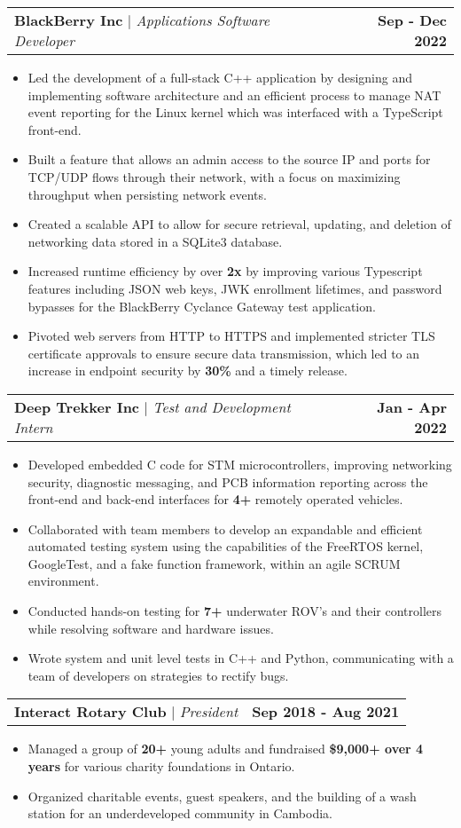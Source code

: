 \documentclass[letterpaper,11pt]{article}
\makeatletter
\newcommand{\subItem}[1]{
  \item\small{{#1 \vspace{-2pt}}}}
\newcommand{\subHeading}[2]{
  \vspace{-5pt}\item
  \begin{tabular*}{1.001\textwidth}{l@{\extracolsep{\fill}}r}
    \small#1 & \textbf{\small #2} 
    \setlength{\parskip}{6pt}
  \end{tabular*}\vspace{-7pt}}
\newcommand{\subItemListStart}{\begin{itemize}}
\newcommand{\subItemListEnd}{\end{itemize}\vspace{-5pt}}
\makeatother
\begin{document}
    \subHeading
      {\textbf{BlackBerry Inc} $|$ \emph{Applications Software Developer}}
      {Sep - Dec 2022}
    \subItemListStart
      \subItem{Led the development of a full-stack C++ application by designing and implementing software architecture and an efficient process to manage NAT event reporting for the Linux kernel which was interfaced with a TypeScript front-end.}
      \subItem{Built a feature that allows an admin access to the source IP and ports for TCP/UDP flows through their network, with a focus on maximizing throughput when persisting network events.}
      \subItem{Created a scalable API to allow for secure retrieval, updating, and deletion of networking data stored in a SQLite3 database.}
      \subItem{Increased runtime efficiency by over \textbf{2x} by improving various Typescript features including JSON web keys, JWK enrollment lifetimes, and password bypasses for the BlackBerry Cyclance Gateway test application.}
      \subItem{Pivoted web servers from HTTP to HTTPS and implemented stricter TLS certificate approvals to ensure secure data transmission, which led to an increase in endpoint security by \textbf{30\%} and a timely release.}
    \subItemListEnd
    \vspace{-13pt}

    \subHeading
      {\textbf{Deep Trekker Inc} $|$ \emph{Test and Development Intern}}
      {Jan - Apr 2022}
    \subItemListStart
      \subItem{Developed embedded C code for STM microcontrollers, improving networking security, diagnostic messaging, and PCB information reporting across the front-end and back-end interfaces for \textbf{4+} remotely operated vehicles.}
      \subItem{Collaborated with team members to develop an expandable and efficient automated testing system using the capabilities of the FreeRTOS kernel, GoogleTest, and a fake function framework, within an agile SCRUM environment.}
      \subItem{Conducted hands-on testing for \textbf{7+} underwater ROV's and their controllers while resolving software and hardware issues.}
      \subItem{Wrote system and unit level tests in C++ and Python, communicating with a team of developers on strategies to rectify bugs.}
    \subItemListEnd
    \vspace{-13pt}

    \subHeading
      {\textbf{Interact Rotary Club} $|$ \emph{President}}
      {Sep 2018 - Aug 2021}
    \subItemListStart
      \subItem{Managed a group of \textbf{20+} young adults and fundraised \textbf{\$9,000+ over 4 years} for various charity foundations in Ontario.}
      \subItem{Organized charitable events, guest speakers, and the building of a wash station for an underdeveloped community in Cambodia.}
    \subItemListEnd
\end{document}
